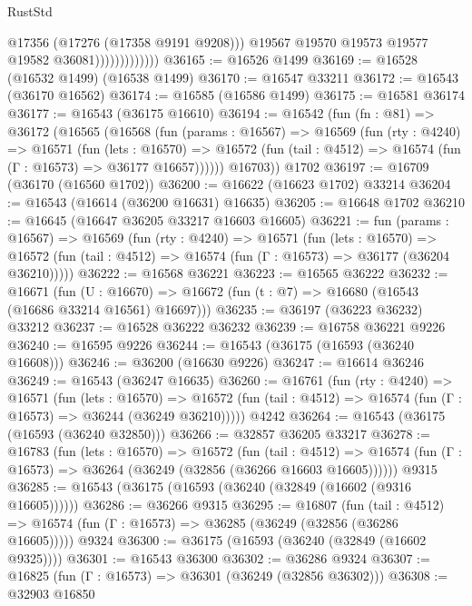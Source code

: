 \begin{lexlean}{RustStd}
\begin{coremodule}
                                @17356
                                (@17276 (@17358 @9191 @9208)))
                              @19567
                              @19570
                              @19573
                              @19577
                              @19582
                              @36081)))))))))))))
@36165 := @16526 @1499
@36169 := @16528 (@16532 @1499) (@16538 @1499)
@36170 := @16547 @33211
@36172 := @16543 (@36170 @16562)
@36174 := @16585 (@16586 @1499)
@36175 := @16581 @36174
@36177 := @16543 (@36175 @16610)
@36194 := @16542
    (fun (fn : @81) =>
    @36172
      (@16565
        (@16568
          (fun (params : @16567) =>
          @16569
            (fun (rty : @4240) =>
            @16571
              (fun (lets : @16570) =>
              @16572 (fun (tail : @4512) => @16574 (fun (Γ : @16573) => @36177 @16657))))))
        @16703))
    @1702
@36197 := @16709 (@36170 (@16560 @1702))
@36200 := @16622 (@16623 @1702) @33214
@36204 := @16543 (@16614 (@36200 @16631) @16635)
@36205 := @16648 @1702
@36210 := @16645 (@16647 @36205 @33217 @16603 @16605)
@36221 := fun (params : @16567) =>
  @16569
    (fun (rty : @4240) =>
    @16571
      (fun (lets : @16570) =>
      @16572 (fun (tail : @4512) => @16574 (fun (Γ : @16573) => @36177 (@36204 @36210)))))
@36222 := @16568 @36221
@36223 := @16565 @36222
@36232 := @16671
    (fun (U : @16670) => @16672 (fun (t : @7) => @16680 (@16543 (@16686 @33214 @16561) @16697)))
@36235 := @36197 (@36223 @36232) @33212
@36237 := @16528 @36222 @36232
@36239 := @16758 @36221 @9226
@36240 := @16595 @9226
@36244 := @16543 (@36175 (@16593 (@36240 @16608)))
@36246 := @36200 (@16630 @9226)
@36247 := @16614 @36246
@36249 := @16543 (@36247 @16635)
@36260 := @16761
    (fun (rty : @4240) =>
    @16571
      (fun (lets : @16570) =>
      @16572 (fun (tail : @4512) => @16574 (fun (Γ : @16573) => @36244 (@36249 @36210)))))
    @4242
@36264 := @16543 (@36175 (@16593 (@36240 @32850)))
@36266 := @32857 @36205 @33217
@36278 := @16783
    (fun (lets : @16570) =>
    @16572
      (fun (tail : @4512) =>
      @16574 (fun (Γ : @16573) => @36264 (@36249 (@32856 (@36266 @16603 @16605))))))
    @9315
@36285 := @16543 (@36175 (@16593 (@36240 (@32849 (@16602 (@9316 @16605))))))
@36286 := @36266 @9315
@36295 := @16807
    (fun (tail : @4512) => @16574 (fun (Γ : @16573) => @36285 (@36249 (@32856 (@36286 @16605)))))
    @9324
@36300 := @36175 (@16593 (@36240 (@32849 (@16602 @9325))))
@36301 := @16543 @36300
@36302 := @36286 @9324
@36307 := @16825 (fun (Γ : @16573) => @36301 (@36249 (@32856 @36302)))
@36308 := @32903 @16850

\end{coremodule}
\end{lexlean}

